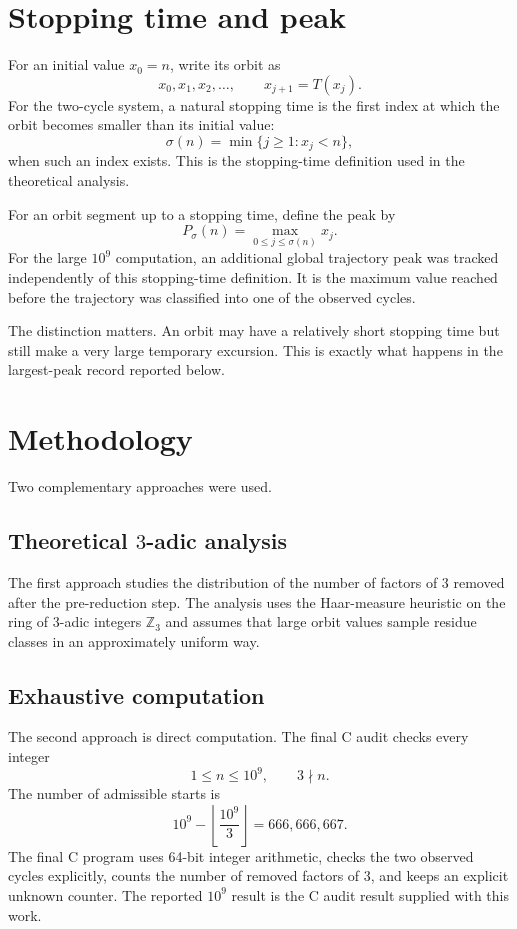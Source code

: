 \documentclass[11pt]{article}
\begin{document}
\section{Stopping time and peak}
For an initial value $x_0=n$, write its orbit as
\[
x_0,x_1,x_2,\ldots,
\qquad x_{j+1}=T(x_j).
\]
For the two-cycle system, a natural stopping time is the first index at which the orbit becomes smaller than its initial value:
\[
\sigma(n)=\min\{j\ge1:x_j<n\},
\tag{3}
\]
when such an index exists. This is the stopping-time definition used in the theoretical analysis.

For an orbit segment up to a stopping time, define the peak by
\[
P_\sigma(n)=\max_{0\le j\le\sigma(n)}x_j.
\tag{4}
\]
For the large $10^9$ computation, an additional global trajectory peak was tracked independently of this stopping-time definition. It is the maximum value reached before the trajectory was classified into one of the observed cycles.

The distinction matters. An orbit may have a relatively short stopping time but still make a very large temporary excursion. This is exactly what happens in the largest-peak record reported below.

\section{Methodology}
Two complementary approaches were used.

\subsection{Theoretical $3$-adic analysis}
The first approach studies the distribution of the number of factors of $3$ removed after the pre-reduction step. The analysis uses the Haar-measure heuristic on the ring of $3$-adic integers $\mathbb Z_3$ and assumes that large orbit values sample residue classes in an approximately uniform way.

\subsection{Exhaustive computation}
The second approach is direct computation. The final C audit checks every integer
\[
1\le n\le10^9,
\qquad 3\nmid n.
\]
The number of admissible starts is
\[
10^9-\left\lfloor\frac{10^9}{3}\right\rfloor
=666,666,667.
\]
The final C program uses 64-bit integer arithmetic, checks the two observed cycles explicitly, counts the number of removed factors of $3$, and keeps an explicit unknown counter. The reported $10^9$ result is the C audit result supplied with this work.
\end{document}
